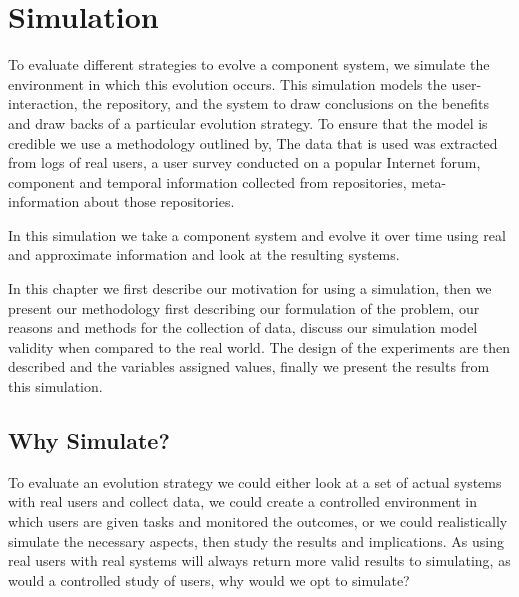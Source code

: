 \chapter{Simulation}
\label{simulation}
{}To evaluate different strategies to evolve a component system, we simulate the environment in which this evolution occurs.
{}This simulation models the user-interaction, the repository, and the system
{}to draw conclusions on the benefits and draw backs of a particular evolution strategy.
{}To ensure that the model is credible we use a methodology outlined by, %
{}The data that is used was extracted from logs of real users, a user survey conducted on a popular Internet forum, 
{}component and temporal information collected from repositories, meta-information about those repositories.

{}In this simulation we take a component system and evolve it over time using real and approximate information and look at the resulting systems.

{}In this chapter we first describe our motivation for using a simulation,
{}then we present our methodology
{}first describing our formulation of the problem,
{}our reasons and methods for the collection of data,
{}discuss our simulation model validity when compared to the real world.
{}The design of the experiments are then described and the variables assigned values,
{}finally we present the results from this simulation.
 
\section{Why Simulate?}
To evaluate an evolution strategy we could either look at a set of actual systems with real users and collect data,
we could create a controlled environment in which users are given tasks and monitored the outcomes,
or we could realistically simulate the necessary aspects, then study the results and implications.
As using real users with real systems will always return more valid results to simulating, as would a controlled study of users,
why would we opt to simulate?

